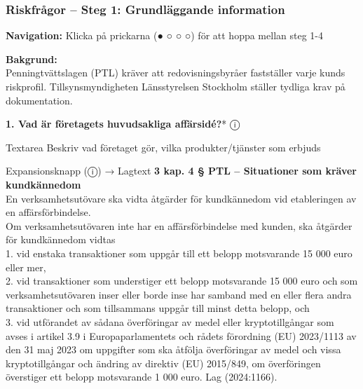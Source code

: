 \documentclass[10pt]{beamer}
\begin{document}
\begin{frame}[label=riskfragor-steg1]
  \frametitle{Riskfrågor – Steg 1: Grundläggande information}
  
  \vspace{-0.2cm}
  \begin{center}
    \tiny \textbf{Navigation:} Klicka på prickarna (● ○ ○ ○) för att hoppa mellan steg 1-4
  \end{center}

  \vspace{0.3cm}

  \footnotesize
  \textbf{Bakgrund:}\\
  Penningtvättslagen (PTL) kräver att redovisningsbyråer fastställer varje kunds riskprofil. 
  Tillsynsmyndigheten Länsstyrelsen Stockholm ställer tydliga krav på dokumentation.

  \vspace{0.4cm}

  \textbf{1. Vad är företagets huvudsakliga affärsidé?}* \hspace{0.3cm} ⓘ
  \begin{block}{Textarea}
    \tiny Beskriv vad företaget gör, vilka produkter/tjänster som erbjuds
  \end{block}
  \begin{alertblock}{Expansionsknapp (ⓘ) → Lagtext}
    \tiny \textbf{3 kap. 4 § PTL – Situationer som kräver kundkännedom}\\
    \tiny  En verksamhetsutövare ska vidta åtgärder för kundkännedom vid etableringen av en 
    affärsförbindelse.\\

    \tiny Om verksamhetsutövaren inte har en affärsförbindelse med kunden, ska åtgärder för kundkännedom vidtas\\
    \tiny 1. vid enstaka transaktioner som uppgår till ett belopp motsvarande 15 000 euro eller mer,\\
    \tiny 2. vid transaktioner som understiger ett belopp motsvarande 15 000 euro och som verksamhetsutövaren 
    inser eller borde inse har samband med en eller flera andra transaktioner och som tillsammans 
    uppgår till minst detta belopp, och\\
    \tiny 3. vid utförandet av sådana överföringar av medel eller kryptotillgångar som avses i artikel 3.9
    i Europaparlamentets och rådets förordning (EU) 2023/1113 av den 31 maj 2023 om uppgifter som 
    ska åtfölja överföringar av medel och vissa kryptotillgångar och ändring av direktiv (EU) 2015/849, 
    om överföringen överstiger ett belopp motsvarande 1 000 euro.
    Lag (2024:1166).\\[0.1cm]
    

\end{alertblock}
\end{frame}
\end{document}
